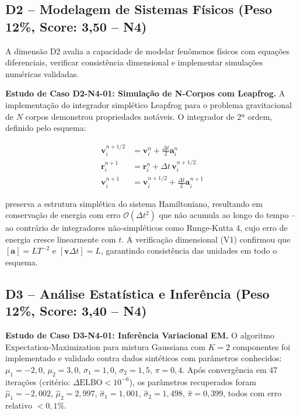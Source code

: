 \subsection{D2 -- Modelagem de Sistemas Físicos (Peso 12\%, Score: 3,50 -- N4)}

A dimensão D2 avalia a capacidade de modelar fenômenos físicos com
equações diferenciais, verificar consistência dimensional e implementar
simulações numéricas validadas.

\textbf{Estudo de Caso D2-N4-01: Simulação de N-Corpos com Leapfrog.} A
implementação do integrador simplético Leapfrog para o problema
gravitacional de $N$ corpos demonstrou propriedades notáveis. O
integrador de 2ª ordem, definido pelo esquema:

\begin{align}
\mathbf{v}_{i}^{n+1/2} &= \mathbf{v}_{i}^{n} + \frac{\Delta t}{2}\mathbf{a}_{i}^{n} \\
\mathbf{r}_{i}^{n+1} &= \mathbf{r}_{i}^{n} + \Delta t\,\mathbf{v}_{i}^{n+1/2} \\
\mathbf{v}_{i}^{n+1} &= \mathbf{v}_{i}^{n+1/2} + \frac{\Delta t}{2}\mathbf{a}_{i}^{n+1}
\end{align}

preserva a estrutura simplética do sistema Hamiltoniano, resultando em
conservação de energia com erro $\mathcal{O}(\Delta t^2)$ que não acumula
ao longo do tempo -- ao contrário de integradores não-simpléticos como
Runge-Kutta 4, cujo erro de energia cresce linearmente com $t$. A
verificação dimensional (V1) confirmou que $[\mathbf{a}] = LT^{-2}$ e
$[\mathbf{v}\Delta t] = L$, garantindo consistência das unidades em todo
o esquema.

\subsection{D3 -- Análise Estatística e Inferência (Peso 12\%, Score: 3,40 -- N4)}

\textbf{Estudo de Caso D3-N4-01: Inferência Variacional EM.} O algoritmo
Expectation-Maximization para mistura Gaussiana com $K=2$ componentes foi
implementado e validado contra dados sintéticos com parâmetros
conhecidos: $\mu_1 = -2{,}0$, $\mu_2 = 3{,}0$, $\sigma_1 = 1{,}0$,
$\sigma_2 = 1{,}5$, $\pi = 0{,}4$. Após convergência em 47 iterações
(critério: $\Delta\text{ELBO} < 10^{-6}$), os parâmetros recuperados
foram $\hat{\mu}_1 = -2{,}002$, $\hat{\mu}_2 = 2{,}997$,
$\hat{\sigma}_1 = 1{,}001$, $\hat{\sigma}_2 = 1{,}498$, $\hat{\pi} =
0{,}399$, todos com erro relativo $< 0{,}1\%$.


